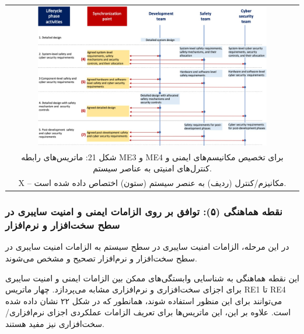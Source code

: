 \documentclass[a4paper,10pt]{article}
\begin{document}
                \begin{table}
            
                    \centering
                    \begin{tabular}{ c }
                        
                        \includegraphics[width=0.8\textwidth]{Image/fig19.jpg} \\
        
                        شکل 21: ماتریس‌های رابطه ME3 و ME4 برای تخصیص مکانیسم‌های ایمنی و کنترل‌های امنیتی به عناصر سیستم.\\
                        
                        X – مکانیزم/کنترل (ردیف) به عنصر سیستم (ستون) اختصاص داده شده است.
    
                    \end{tabular}
        
                \end{table}

            \subsubsection{نقطه هماهنگی (۵): توافق بر روی الزامات ایمنی و امنیت سایبری در سطح سخت‌افزار و نرم‌افزار}

                در این مرحله، الزامات امنیت سایبری در سطح سیستم به الزامات امنیت سایبری در سطح سخت‌افزار و نرم‌افزار تصحیح و مشخص می‌شوند.

                این نقطه هماهنگی به شناسایی وابستگی‌های ممکن بین الزامات ایمنی و امنیت سایبری برای اجزای سخت‌افزاری و نرم‌افزاری مشابه می‌پردازد. چهار ماتریس RE1 تا RE4 می‌توانند برای این منظور استفاده شوند، همانطور که در شکل ۲۲ نشان داده شده است. علاوه بر این، این ماتریس‌ها برای تعریف الزامات عملکردی اجزای نرم‌افزاری/سخت‌افزاری نیز مفید هستند.
\end{document}
